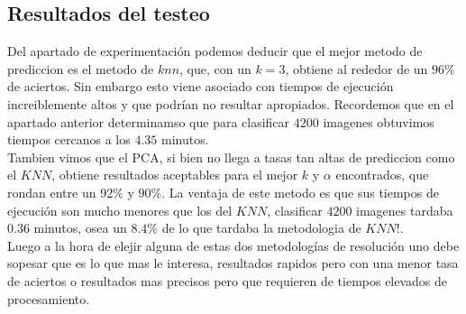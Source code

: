 \subsection{Resultados del testeo}
Del apartado de experimentación podemos deducir que el mejor metodo de prediccion es el metodo de $knn$, que, con un $k=3$, obtiene al rededor de un $96 \%$ de aciertos. Sin embargo esto viene asociado con tiempos de ejecución increiblemente altos y que podrían no resultar apropiados. Recordemos que en el apartado anterior determinamso que para clasificar $4200$ imagenes obtuvimos tiempos cercanos a los $4.35$ minutos.
\\
Tambien vimos que el PCA, si bien no llega a tasas tan altas de prediccion como el $KNN$, obtiene resultados aceptables para el mejor $k$ y $\alpha$ encontrados, que rondan entre un $92 \%$ y $90 \%$. La ventaja de este metodo es que sus tiempos de ejecución son mucho menores que los del $KNN$, clasificar $4200$ imagenes tardaba $0.36$ minutos, osea un $8.4 \%$ de lo que tardaba la metodologia de $KNN$!. 
\\
Luego a la hora de elejir alguna de estas dos metodologías de resolución uno debe sopesar que es lo que mas le interesa, resultados rapidos pero con una menor tasa de aciertos o resultados mas precisos pero que requieren de tiempos elevados de procesamiento.
